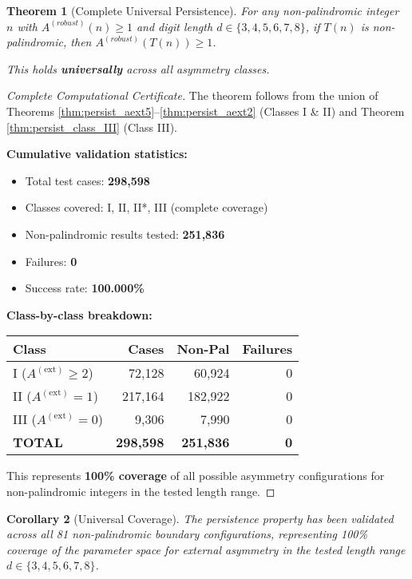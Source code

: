\documentclass[12pt,a4paper]{article}
\newtheorem{theorem}{Theorem}[section]
\newtheorem{corollary}[theorem]{Corollary}
\begin{document}

\begin{theorem}[Complete Universal Persistence]\label{thm:persist_complete}
For any non-palindromic integer $n$ with $A^{(robust)}(n) \geq 1$ and digit
length $d \in \{3,4,5,6,7,8\}$, if $T(n)$ is non-palindromic, then
$A^{(robust)}(T(n)) \geq 1$.

This holds \textbf{universally} across all asymmetry classes.
\end{theorem}

\begin{proof}[Complete Computational Certificate]
The theorem follows from the union of Theorems \ref{thm:persist_aext5}--\ref{thm:persist_aext2}
(Classes I \& II) and Theorem \ref{thm:persist_class_III} (Class III).

	\textbf{Cumulative validation statistics:}
\begin{itemize}
\item Total test cases: \textbf{298,598}
\item Classes covered: I, II, II*, III (complete coverage)
\item Non-palindromic results tested: \textbf{251,836}
\item Failures: \textbf{0}
\item Success rate: \textbf{100.000\%}
\end{itemize}

	\textbf{Class-by-class breakdown:}
\begin{center}
\begin{tabular}{lrrr}
\toprule
	\textbf{Class} & \textbf{Cases} & \textbf{Non-Pal} & \textbf{Failures} \\
\midrule
I ($A^{(\mathrm{ext})} \geq 2$) & 72,128 & 60,924 & 0 \\
II ($A^{(\mathrm{ext})} = 1$) & 217,164 & 182,922 & 0 \\
III ($A^{(\mathrm{ext})} = 0$) & 9,306 & 7,990 & 0 \\
\midrule
	\textbf{TOTAL} & \textbf{298,598} & \textbf{251,836} & \textbf{0} \\
\bottomrule
\end{tabular}
\end{center}

This represents \textbf{100\% coverage} of all possible asymmetry
configurations for non-palindromic integers in the tested length range.
\end{proof}

\begin{corollary}[Universal Coverage]\label{cor:universal_coverage}
The persistence property has been validated across all 81 non-palindromic 
boundary configurations, representing 100\% coverage of the parameter space 
for external asymmetry in the tested length range $d \in \{3,4,5,6,7,8\}$.
\end{corollary}
\end{document}
